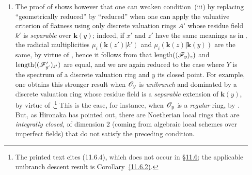 \begin{remarks}[15.2.4]
\begin{enumerate}[label=(\roman*)]
To construct the rings $A$ and $A'$, let us start from an imperfect field $k$ of characteristic $p>0$; let $K_0=k((T))$ be the field of formal Laurent series over $k$, and let $A_0$ be its valuation ring for the discrete valuation given by the order of a formal Laurent series; the residue field of $A_0$ is thus $k$.
Let $\alpha$ be an element of $k$ that is not a $p$-th power, and let us take $k'=k(\alpha^{1/p})$; $K=k'((T))$ is then a finite radicial extension of $K_0$, and $A'=A_0\otimes_k k'$ is the discrete valuation ring for $K$.
If $\mathfrak{m}'$ is the maximal ideal of $A'$, conditions~$1)$ and $2)$ are satisfied by taking $A=A_0+\mathfrak{m}'$: indeed, as $A_0$ is Noetherian and $A'$ is an $A_0$-module of finite type, $A$ is a finite $A_0$-algebra, hence a Noetherian ring; since $A'$ is finite over $A$, $\mathfrak{m}'$ is the only maximal ideal of $A$, which is thus a complete local ring, evidently of dimension $1$ (being finite over $A_0$) and geometrically unibranch, since $A'$ is integrally closed and has the same field of fractions $K$ as $A$.
  \item The proof of  shows however that one can weaken condition~(iii) by replacing ``geometrically reduced'' by ``reduced'' when one can apply the valuative criterion of flatness  using only discrete valuation rings $A'$ whose residue field $k'$ is \emph{separable} over $\boldsymbol{k}(y)$; indeed, if $x'$ and $z'$ have the same meanings as in , the radicial multiplicities $\mu_i(\boldsymbol{k}(z')|k')$ and $\mu_i(\boldsymbol{k}(z)|\boldsymbol{k}(y))$ are the same, by virtue of , hence it follows from  that $\operatorname{length}((\mathscr{F}_y)_z)$ and $\operatorname{length}((\mathscr{F}_{y'}')_{z'})$ are equal, and we are again reduced to the case where $Y$ is the spectrum of a discrete valuation ring and $y$ its closed point.
For example, one obtains this stronger result when $\mathscr{O}_y$ is \emph{unibranch} and dominated by a discrete valuation ring whose residue field is a \emph{separable} extension of $\boldsymbol{k}(y)$, by virtue of .\footnote{The printed text cites (11.6.4), which does not occur in {\hyperref[subsection:IV.11.6]{\S11.6}}; the applicable unibranch descent result is Corollary~{\hyperref[IV.11.6.2]{(11.6.2)}}.}
This is the case, for instance, when $\mathscr{O}_y$ is a \emph{regular} ring, by .
But, as Hironaka has pointed out, there are Noetherian local rings that are \emph{integrally closed}, of dimension $2$ (coming from algebraic local schemes over imperfect fields) that do not satisfy the preceding condition.
\end{enumerate}
\end{remarks}

